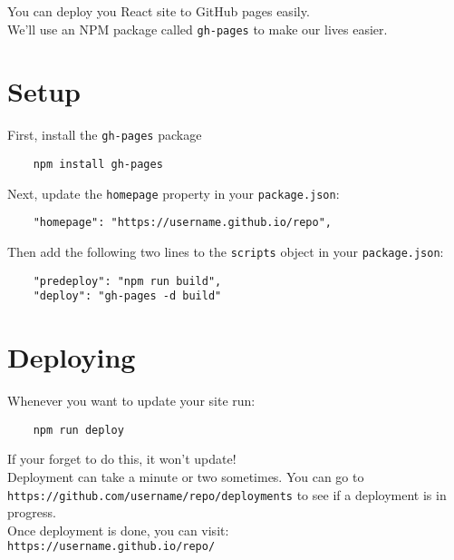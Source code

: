 You can deploy you React site to GitHub pages easily.
\\

We'll use an NPM package called \texttt{gh-pages} to make our lives easier.

\section{Setup}

First, install the \texttt{gh-pages} package

\begin{verbatim}
    npm install gh-pages
\end{verbatim}

Next, update the \texttt{homepage} property in your \texttt{package.json}:

\begin{verbatim}
    "homepage": "https://username.github.io/repo",
\end{verbatim}

Then add the following two lines to the \texttt{scripts} object in your \texttt{package.json}:

\begin{verbatim}
    "predeploy": "npm run build",
    "deploy": "gh-pages -d build"
\end{verbatim}


\pagebreak


\section{Deploying}

Whenever you want to update your site run:

\begin{verbatim}
    npm run deploy
\end{verbatim}

If your forget to do this, it won't update!
\\

Deployment can take a minute or two sometimes. You can go to \\ \texttt{https://github.com/username/repo/deployments} to see if a deployment is in progress.
\\

Once deployment is done, you can visit:\\ \texttt{https://username.github.io/repo/}

